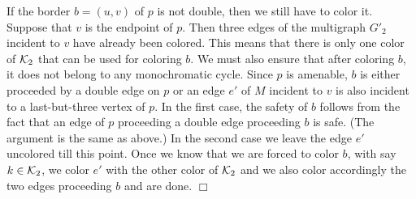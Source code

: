\documentclass[a4, 11pt]{article}
\newcommand{\koniec}{\hfill $\Box$\\[.1ex]}
\newcommand{\<}{\langle}
\renewcommand{\>}{\rangle}
\newcommand{\Kd}{{\cal K}_2}
\begin{document}
If the border $b=(u,v)$ of $p$ is not double, then we still have to color it. Suppose that $v$ is the endpoint of $p$. Then three edges of the multigraph $G'_2$ incident to $v$ have already been colored. This means that there is only one color of $\Kd$ that can be used for coloring $b$. We must also ensure that after coloring $b$, it does not belong to any monochromatic cycle. Since $p$ is amenable, $b$ is either proceeded by a double edge on $p$ or an edge $e'$ of $M$ incident to $v$ is also incident to a last-but-three vertex of $p$. In the first case, the safety of $b$ follows from the fact that an edge of $p$ proceeding a double edge proceeding $b$ is safe. (The argument is the same as above.) In the second case 
we leave the edge $e'$ uncolored till this point. Once we know that we are forced to color $b$, with say $k \in \Kd$, we color $e'$ with the other color of $\Kd$ and we also color accordingly the two edges proceeding $b$ and are done.
\koniec
\end{document}
